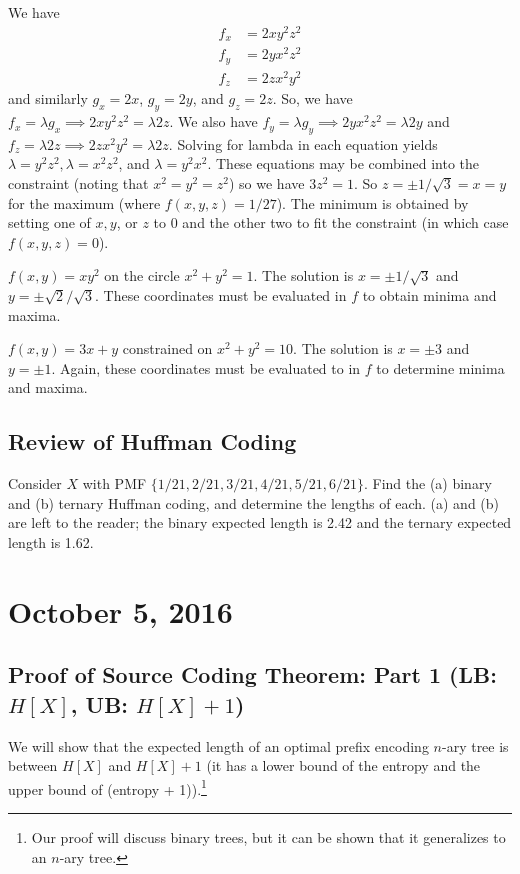 \documentclass[11pt]{article}
\theoremstyle{definition}
\begin{document}
 We have 
\begin{align*}
f_x &= 2xy^2z^2 \\
f_y &= 2yx^2z^2 \\
f_z &= 2zx^2y^2
\end{align*}
and similarly $g_x = 2x$, $g_y = 2y$, and $g_z = 2z$. So, we have $f_x = \lambda g_x \implies 2xy^2z^2 = \lambda 2z$. We also have $f_y = \lambda g_y \implies 2yx^2z^2 = \lambda 2y$ and $f_z = \lambda 2z \implies 2zx^2y^2 = \lambda 2z$. Solving for lambda in each equation yields $\lambda = y^2z^2, \lambda = x^2z^2$, and $\lambda = y^2x^2$. These equations may be combined into the constraint (noting that $x^2 = y^2 = z^2$) so we have $3z^2 = 1$. So $z = \pm 1/\sqrt{3} = x = y$ for the maximum (where $f(x,y,z) = 1/27$). The minimum is obtained by setting one of $x, y$, or $z$ to 0 and the other two to fit the constraint (in which case $f(x, y,z) = 0$).  

\example $f(x,y) = xy^2$ on the circle $x^2 + y^2 = 1$. The solution is $x = \pm 1/\sqrt{3}$ and $y = \pm \sqrt{2}/\sqrt{3}$. These coordinates must be evaluated in $f$ to obtain minima and maxima. 

\example $f(x,y) = 3x + y$ constrained on $x^2 + y^2 = 10$. The solution is $x = \pm 3$ and $y = \pm 1$. Again, these coordinates must be evaluated to in $f$ to determine minima and maxima.

\subsection{Review of Huffman Coding}

Consider $X$ with PMF $\{1/21, 2/21, 3/21, 4/21, 5/21, 6/21\}$. Find the (a) binary and (b) ternary Huffman coding, and determine the lengths of each. (a) and (b) are left to the reader; the binary expected length is 2.42 and the ternary expected length is 1.62.

\section{October 5, 2016}
\subsection{Proof of Source Coding Theorem: Part 1 (LB: $H[X]$, UB: $H[X] + 1$)}
We will show that the expected length of an optimal prefix encoding $n$-ary tree is between $H[X]$ and $H[X] + 1$ (it has a lower bound of the entropy and the upper bound of (entropy + 1)).\footnote{Our proof will discuss binary trees, but it can be shown that it generalizes to an $n$-ary tree.} 
\end{document}
